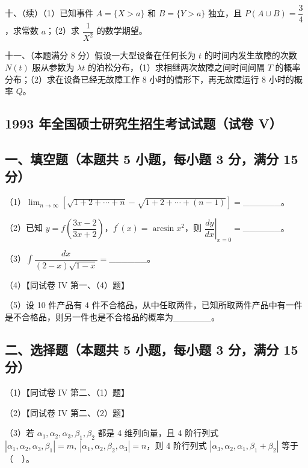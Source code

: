 \documentclass[UTF8,12pt]{ctexart}
\begin{document}
十、（续）（1）已知事件 \(\displaystyle A=\{X>a\}\) 和 \(\displaystyle B=\{Y>a\}\) 独立，且 \(\displaystyle P(A\cup B)=\dfrac{\displaystyle 3}{\displaystyle 4}\)，求常数 \(\displaystyle a\)；（2）求 \(\displaystyle \dfrac{\displaystyle 1}{\displaystyle X^2}\) 的数学期望。


十一、（本题满分 8 分）假设一大型设备在任何长为 \(\displaystyle t\) 的时间内发生故障的次数 \(\displaystyle N(t)\) 服从参数为 \(\displaystyle \lambda t\) 的泊松分布，（1）求相继两次故障之间时间间隔 \(\displaystyle T\) 的概率分布；（2）求在设备已经无故障工作 8 小时的情形下，再无故障运行 8 小时的概率 \(\displaystyle Q\)。


\subsection*{1993 年全国硕士研究生招生考试试题（试卷 V）}

\subsection*{一、填空题（本题共 5 小题，每小题 3 分，满分 15 分）}

（1）\(\displaystyle \lim_{n\to\infty}\left[\sqrt{1+2+\cdots+n}-\sqrt{1+2+\cdots+(n-1)}\right]=\)\_\_\_\_\_\_。


（2）已知 \(\displaystyle y=f\left(\dfrac{\displaystyle 3x-2}{\displaystyle 3x+2}\right)\)，\(\displaystyle f^{\prime}(x)=\arcsin x^2\)，则 \(\displaystyle \left.\dfrac{\displaystyle dy}{\displaystyle dx}\right|_{x=0}=\)\_\_\_\_\_\_。


（3）\(\displaystyle \int\dfrac{\displaystyle dx}{\displaystyle (2-x)\sqrt{1-x}}=\)\_\_\_\_\_\_。


（4）【同试卷 IV 第一、（4）题】


（5）设 10 件产品有 4 件不合格品，从中任取两件，已知所取两件产品中有一件是不合格品，则另一件也是不合格品的概率为\_\_\_\_\_\_。


\subsection*{二、选择题（本题共 5 小题，每小题 3 分，满分 15 分）}

（1）【同试卷 IV 第二、（1）题】


（2）【同试卷 IV 第二、（2）题】


（3）若 \(\displaystyle \alpha_1,\allowbreak \alpha_2,\allowbreak \alpha_3,\allowbreak \beta_1,\allowbreak \beta_2\) 都是 4 维列向量，且 4 阶行列式 \(\displaystyle |\alpha_1,\allowbreak \alpha_2,\allowbreak \alpha_3,\allowbreak \beta_1|=m,\allowbreak \ |\alpha_1,\allowbreak \alpha_2,\allowbreak \beta_2,\allowbreak \alpha_3|=n\)，则 4 阶行列式 \(\displaystyle |\alpha_3,\allowbreak \alpha_2,\allowbreak \alpha_1,\allowbreak \beta_1+\beta_2|\) 等于（　）。
\end{document}
